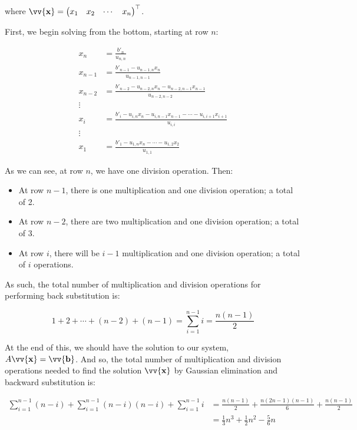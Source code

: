 \documentclass[12pt]{article}
\newcommand{\vect}[1]{\vv{\mathbf{#1}}}
\begin{document}
where $\vect{x} = \begin{pmatrix}
    x_1 & x_2 & \cdots & x_n
\end{pmatrix}^\top$.

First, we begin solving from the bottom, starting at row $n$:

\begin{align*}
    x_n &= \frac{b'_n}{u_{n,n}} \\
    x_{n-1} &= \frac{b'_{n-1} - u_{n-1,n}x_n}{u_{n-1,n-1}} \\
    x_{n-2} &= \frac{b'_{n-2} - u_{n-2,n}x_n - u_{n-2,n-1}x_{n-1}}{u_{n-2,n-2}} \\
    \vdots \\
    x_i &= \frac{b'_i - u_{i,n}x_n - u_{i,n-1}x_{n-1} - \cdots - u_{i,i+1}x_{i+1}}{u_{i,i}} \\
    \vdots \\
    x_1 &= \frac{b'_1 - u_{1,n}x_n - \cdots - u_{1,2}x_2}{u_{1,1}}
\end{align*}

As we can see, at row $n$, we have one division operation. Then:

\begin{itemize}
    \item At row $n-1$, there is one multiplication and one division operation; a total of 2.
    \item At row $n-2$, there are two multiplication and one division operation; a total of 3.
    \item At row $i$, there will be $i-1$ multiplication and one division operation; a total of $i$ operations.
\end{itemize}

As such, the total number of multiplication and division operations for performing back substitution is:

$$
1 + 2 + \cdots + (n-2) + (n-1) = \sum_{i=1}^{n-1} i = \frac{n(n-1)}{2}
$$

At the end of this, we should have the solution to our system, $A\vect{x}=\vect{b}$. And so, the total number of multiplication and division operations needed to find the solution $\vect{x}$ by Gaussian elimination and backward substitution is:

\begin{align*}
    \sum_{i=1}^{n-1} (n-i) + \sum_{i=1}^{n-1} (n-i)(n-i) + \sum_{i=1}^{n-1} i
    &= \frac{n(n-1)}{2} + \frac{n(2n-1)(n-1)}{6} + \frac{n(n-1)}{2} \\
    &= \frac{1}{3}n^3 + \frac{1}{2}n^2 - \frac{5}{6}n
\end{align*}
\end{document}
